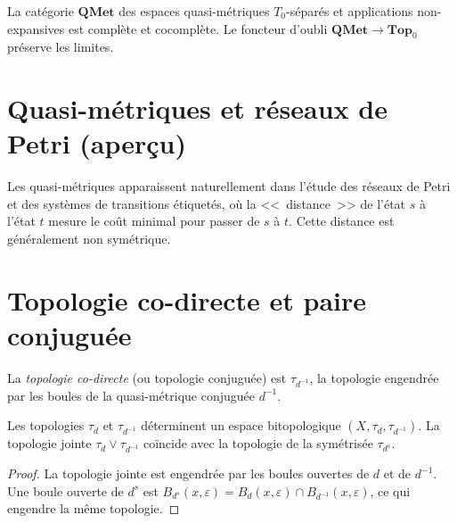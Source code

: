 \begin{theoreme}
La cat\'egorie $\mathbf{QMet}$ des espaces quasi-m\'etriques $T_0$-s\'epar\'es et
applications non-expansives est compl\`ete et cocompl\`ete. Le foncteur d'oubli
$\mathbf{QMet} \to \mathbf{Top}_0$ pr\'eserve les limites.
\end{theoreme}

\section{Quasi-m\'etriques et r\'eseaux de Petri (aper\c{c}u)}

\begin{remarque}
Les quasi-m\'etriques apparaissent naturellement dans l'\'etude des r\'eseaux de Petri et
des syst\`emes de transitions \'etiquet\'es, o\`u la <<~distance~>> de l'\'etat $s$ \`a
l'\'etat $t$ mesure le co\^ut minimal pour passer de $s$ \`a $t$. Cette distance est
g\'en\'eralement non sym\'etrique.
\end{remarque}

\section{Topologie co-directe et paire conjugu\'ee}

\begin{definition}
La \emph{topologie co-directe} (ou topologie conjugu\'ee) est $\tau_{d^{-1}}$, la topologie
engendr\'ee par les boules de la quasi-m\'etrique conjugu\'ee $d^{-1}$.
\end{definition}

\begin{proposition}
Les topologies $\tau_d$ et $\tau_{d^{-1}}$ d\'eterminent un espace bitopologique
$(X, \tau_d, \tau_{d^{-1}})$. La topologie jointe $\tau_d \vee \tau_{d^{-1}}$ co\"incide
avec la topologie de la sym\'etris\'ee $\tau_{d^s}$.
\end{proposition}

\begin{proof}
La topologie jointe est engendr\'ee par les boules ouvertes de $d$ et de $d^{-1}$. Une
boule ouverte de $d^s$ est $B_{d^s}(x,\varepsilon) = B_d(x,\varepsilon) \cap
B_{d^{-1}}(x,\varepsilon)$, ce qui engendre la m\^eme topologie.
\end{proof}

